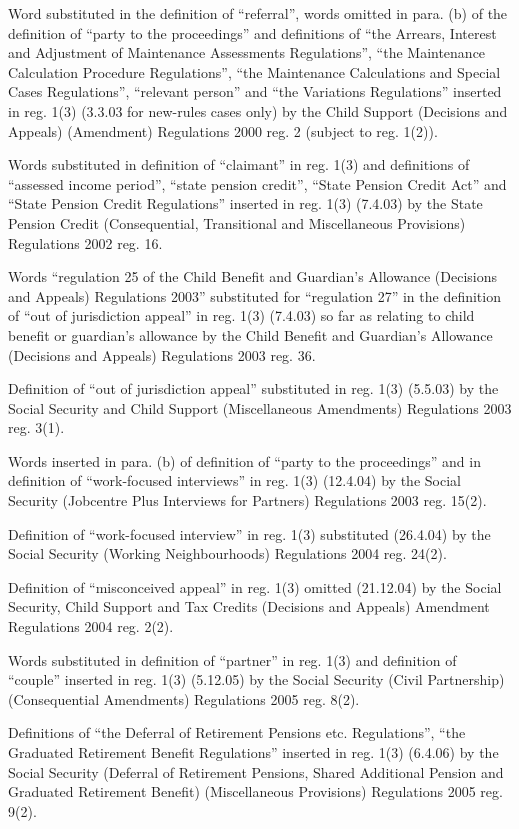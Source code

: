 \documentclass[12pt,a4paper]{article}
\begin{document}
{Word substituted in the definition of ``referral'', words omitted in para. (b) of the definition of ``party to the proceedings'' and definitions of ``the Arrears, Interest and Adjustment of Maintenance Assessments Regulations'', ``the Maintenance Calculation Procedure Regulations'', ``the Maintenance Calculations and Special Cases Regulations'', ``relevant person'' and ``the Variations Regulations'' inserted in reg. 1(3) (3.3.03 for new-rules cases only) by the Child Support (Decisions and Appeals) (Amendment) Regulations 2000 reg. 2 (subject to reg. 1(2)).

Words substituted in definition of ``claimant'' in reg. 1(3) and definitions of ``assessed income period'', ``state pension credit'', ``State Pension Credit Act'' and ``State Pension Credit Regulations'' inserted in reg. 1(3) (7.4.03) by the State Pension Credit (Consequential, Transitional and Miscellaneous Provisions) Regulations 2002 reg. 16.

Words ``regulation 25 of the Child Benefit and Guardian's Allowance (Decisions and Appeals) Regulations 2003'' substituted for ``regulation 27'' in the definition of ``out of jurisdiction appeal'' in reg. 1(3) (7.4.03) so far as relating to child benefit or guardian's allowance by the Child Benefit and Guardian’s Allowance (Decisions and Appeals) Regulations 2003 reg. 36.

Definition of ``out of jurisdiction appeal'' substituted in reg. 1(3) (5.5.03) by the Social Security and Child Support (Miscellaneous Amendments) Regulations 2003 reg. 3(1).

Words inserted in para. (b) of definition of ``party to the proceedings'' and in definition of ``work-focused interviews'' in reg. 1(3) (12.4.04) by the Social Security (Jobcentre Plus Interviews for Partners) Regulations 2003 reg. 15(2).

Definition of ``work-focused interview'' in reg. 1(3) substituted (26.4.04) by the Social Security (Working Neighbourhoods) Regulations 2004 reg. 24(2).

Definition of ``misconceived appeal'' in reg. 1(3) omitted (21.12.04) by the Social Security, Child Support and Tax Credits (Decisions and Appeals) Amendment Regulations 2004 reg. 2(2).

Words substituted in definition of ``partner'' in reg. 1(3) and definition of ``couple'' inserted in reg. 1(3) (5.12.05) by the Social Security (Civil Partnership) (Consequential Amendments) Regulations 2005 reg. 8(2).

Definitions of ``the Deferral of Retirement Pensions etc. Regulations'', ``the Graduated Retirement Benefit Regulations'' inserted in reg. 1(3) (6.4.06) by the Social Security (Deferral of Retirement Pensions, Shared Additional Pension and Graduated Retirement Benefit) (Miscellaneous Provisions) Regulations 2005 reg. 9(2).

}
\end{document}
